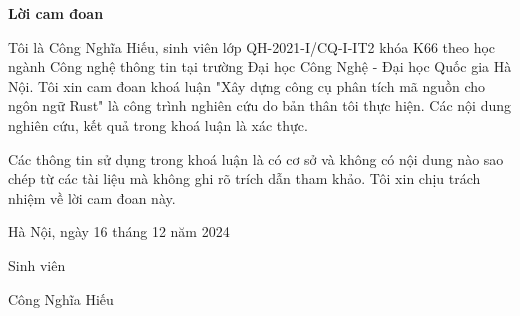 \setcounter{page}{1}
\begin{center}
\textbf{\large{Lời cam đoan}	}
\end{center}

Tôi là Công Nghĩa Hiếu, sinh viên lớp QH-2021-I/CQ-I-IT2 khóa K66 theo học ngành Công nghệ thông tin tại trường Đại học Công Nghệ - Đại học Quốc gia Hà Nội.
Tôi xin cam đoan khoá luận "Xây dựng công cụ phân tích mã nguồn cho ngôn ngữ Rust" là công trình nghiên cứu do bản thân tôi thực hiện.
Các nội dung nghiên cứu, kết quả trong khoá luận là xác thực.

Các thông tin sử dụng trong khoá luận là có cơ sở và không có nội dung nào sao chép từ các tài liệu mà không ghi rõ trích dẫn tham khảo.
Tôi xin chịu trách nhiệm về lời cam đoan này.

\begin{flushright}
Hà Nội, ngày 16 tháng 12 năm 2024
\end{flushright}

\begin{changemargin}{11.5cm}{2cm}
Sinh viên
\\[2cm]
\end{changemargin}

\begin{changemargin}{11cm}{2cm}
Công Nghĩa Hiếu
\end{changemargin}